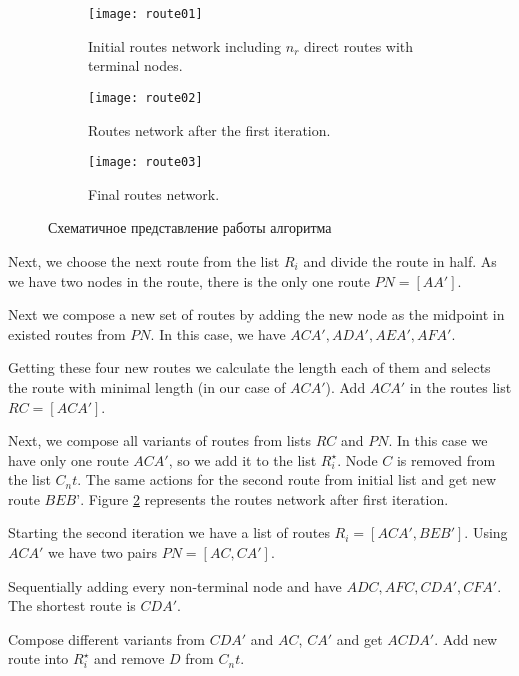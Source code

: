 \begin{figure}[ht!]
    \centering
    \begin{subfigure}{0.3\textwidth}
        \centering
        \texttt{[image: route01]}
        \caption{Initial routes network including \( n_r \) direct routes with terminal nodes.}
        \label{fig:route_first}
    \end{subfigure}
    \begin{subfigure}{0.3\textwidth}
        \centering
        \texttt{[image: route02]}
        \caption{Routes network after the first iteration.}
        \label{fig:route_second}
    \end{subfigure}
    \begin{subfigure}{0.3\textwidth}
        \centering
        \texttt{[image: route03]}
        \caption{Final routes network.}
        \label{fig:route_third}
    \end{subfigure}
    \caption{Схематичное представление работы алгоритма}
    \label{fig:route}
\end{figure}

Next, we choose the next route from the list \( R_i \) and divide the route in half. As we have two nodes 
in the route, there is the only one route \( PN = [AA'] \).

Next we compose a new set of routes by adding the new node as the midpoint in existed routes from \( PN \). 
In this case, we have \( ACA', ADA', AEA', AFA' \). 

Getting these four new routes we calculate the length each of them and selects the route with minimal 
length (in our case of \( ACA' \)). Add \( ACA' \) in the routes list \( RC = [ACA'] \).

Next, we compose all variants of routes from lists \( RC \) and \( PN \). In this case we have only one 
route \( ACA' \), so we add it to the list \( R^{\star}_{i} \). Node \( C \) is removed from the list 
\( C_nt \). The same actions for the second route from initial list and get new route \( BEB’ \). 
Figure \ref{fig:route_second} represents the routes network after first iteration. 

Starting the second iteration we have a list of routes \( R_i = [ACA', BEB'] \). Using \( ACA' \) we have 
two pairs \( PN=[AC, CA'] \). 

Sequentially adding every non-terminal node and have \( ADC, AFC, CDA', CFA' \). The shortest route is 
\( CDA' \). 

Compose different variants from \( CDA' \) and \( AC \), \( CA' \) and get \( ACDA' \). Add new route 
into \( R^{\star}_i \) and remove \( D \) from \( C_nt \).

